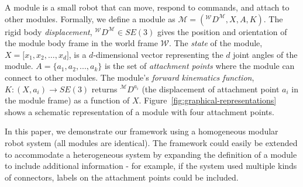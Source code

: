 \documentclass[graybox]{svmult}
\begin{document}
\begin{definition}[Module] A module is a small robot that can move, respond to commands,
and attach to other modules.  Formally, we define a  module  as
$\mathcal{M}=({^\mathcal{W}}D^{\mathcal{M}}, X, A,K)$.
The rigid body \textit{displacement}, ${^\mathcal{W}}D^{\mathcal{M}}\in SE(3)$ 
gives the position and orientation of the module body frame in the world  frame $\mathcal{W}$.
The \textit{state} of the module, \(X=\lbrack x_1, x_2, \ldots, x_d \rbrack\),
 is a \(d\)-dimensional vector representing the \(d\) joint angles of the module.
$A=\{a_1, a_2, ..., a_k\}$ is the set of \textit{attachment points} where the 
module can connect to other modules.
The  module's \textit{forward kinematics function}, \(K: (X, a_i) \rightarrow SE(3) \) 
returns \({^\mathcal{M}}D^{a_{i}}\) (the displacement of attachment point \(a_i\) 
in the module frame) as a function of \(X\).
%
Figure~\ref{fig:graphical-representations} shows a schematic representation of a module with  four attachment points.

In this paper, we demonstrate our framework using a homogeneous modular robot system (all modules are identical). The framework could easily be extended to accommodate a heterogeneous system by expanding the definition of a module to include additional information - for example, if the system used multiple kinds of connectors, labels on the attachment points could be included. 
\end{definition}
%
\end{document}

